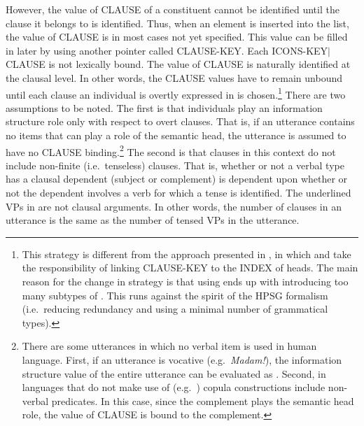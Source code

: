 However, the value of CLAUSE of a constituent cannot be identified
until the clause it belongs to is identified. Thus, when an
 element is inserted into the  list, the
value of CLAUSE is in most cases not yet specified. This value can be
filled in later by using another pointer called CLAUSE-KEY.  Each
\mbox{ICONS-KEY{$\mid$}CLAUSE} is not lexically bound. The
value of CLAUSE is naturally identified at the clausal level.  In
other words, the CLAUSE values have to remain unbound until each
clause an individual is overtly expressed in is chosen.\footnote{This
  strategy is different from the approach presented in
  \citet{song:bender:12}, in which  and
   take the responsibility of linking
  CLAUSE-KEY to the INDEX of heads. The main reason for the change in
  strategy is that using  ends up with
  introducing too many subtypes of
  . This runs against the spirit
  of the HPSG formalism (i.e.\ reducing redundancy and using
  a minimal number of grammatical types).} There are two assumptions
to be noted. The first is that individuals play an information
structure role only with respect to overt clauses.  That is, if an
utterance contains no items that can play a role of the semantic head,
the utterance is assumed to have no CLAUSE binding.\footnote{There are
  some utterances in which no verbal item is used in human language.
  First, if an utterance is vocative (e.g.\ \textit{Madam!}), the
  information structure value of the entire utterance can be evaluated
  as .  Second, in languages that do not make use of
   (e.g.\ ) copula constructions include
  non-verbal predicates. In this case, since the complement plays the
  semantic head role, the value of CLAUSE is bound to the complement.}
The second is that clauses in this context do not include non-finite
(i.e.\ tenseless) clauses. That is, whether or not a verbal type has a
clausal dependent (subject or complement) is dependent upon whether or
not the dependent involves a verb for which a tense is identified. The
underlined VPs in  are not clausal arguments. In other
words, the number of clauses in an utterance is the same as the number
of tensed VPs in the utterance.




